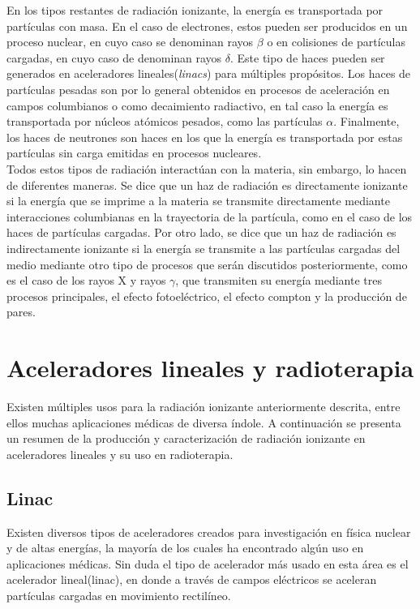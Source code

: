 En los tipos restantes de radiación ionizante, la energía es transportada por partículas con masa. En el caso de electrones, estos pueden ser producidos en un proceso nuclear, en cuyo caso se denominan rayos $\beta$ o en colisiones de partículas cargadas, en cuyo caso de denominan rayos $\delta$. Este tipo de haces pueden ser generados en aceleradores lineales(\textit{linacs}) para múltiples propósitos. Los haces de partículas pesadas son por lo general obtenidos en procesos de aceleración en campos columbianos o como decaimiento radiactivo, en tal caso la energía es transportada por núcleos atómicos pesados, como las partículas $\alpha$. Finalmente, los haces de neutrones son haces en los que la energía es transportada por estas partículas sin carga emitidas en procesos nucleares. \\

Todos estos tipos de radiación interactúan con la materia, sin embargo, lo hacen de diferentes maneras. Se dice que un haz de radiación es directamente ionizante si la energía que se imprime a la materia se transmite directamente mediante interacciones columbianas en la trayectoria de la partícula, como en el caso de los haces de partículas cargadas. Por otro lado, se dice que un haz de radiación es indirectamente ionizante si la energía se transmite a las partículas cargadas del medio mediante otro tipo de procesos que serán discutidos posteriormente, como es el caso de los rayos X y rayos $\gamma$, que transmiten su energía mediante tres procesos principales, el efecto fotoeléctrico, el efecto compton y la producción de pares.\\

\section{Aceleradores lineales y radioterapia}
Existen múltiples usos para la radiación ionizante anteriormente descrita, entre ellos muchas aplicaciones médicas de diversa índole. A continuación se presenta un resumen de la producción y caracterización de radiación ionizante en aceleradores lineales y su uso en radioterapia. 
\subsection{Linac}
Existen diversos tipos de aceleradores creados para investigación en física nuclear y de altas energías, la mayoría de los cuales ha encontrado algún uso en aplicaciones médicas. Sin duda el tipo de acelerador más usado en esta área es el acelerador lineal(linac), en donde a través de campos eléctricos se aceleran partículas cargadas en movimiento rectilíneo. \\

